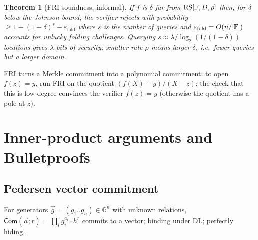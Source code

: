 \documentclass[11pt,a4paper]{report}
\theoremstyle{plain}
\newtheorem{theorem}{Theorem}[chapter]
\theoremstyle{definition}
\theoremstyle{remark}
\newcommand{\GG}{\mathbb{G}}
\begin{document}
\begin{theorem}[FRI soundness, informal]
If $f$ is $\delta$-far from $\mathrm{RS}[\mathbb{F},D,\rho]$ then, for $\delta$ below the Johnson bound, the verifier rejects with probability $\ge1-(1-\delta)^s-\varepsilon_{\mathrm{fold}}$ where $s$ is the number of queries and $\varepsilon_{\mathrm{fold}}=O(n/|\mathbb{F}|)$ accounts for unlucky folding challenges. Querying $s\approx\lambda/\log_2(1/(1-\delta))$ locations gives $\lambda$ bits of security; smaller rate $\rho$ means larger $\delta$, i.e.\ fewer queries but a larger domain.
\end{theorem}
FRI turns a Merkle commitment into a polynomial commitment: to open $f(z)=y$, run FRI on the quotient $(f(X)-y)/(X-z)$; the check that this is low-degree convinces the verifier $f(z)=y$ (otherwise the quotient has a pole at $z$).

\section{Inner-product arguments and Bulletproofs}
\subsection{Pedersen vector commitment}
For generators $\vec g=(g_1..g_n)\in\GG^n$ with unknown relations, $\mathsf{Com}(\vec a;r)=\prod_ig_i^{a_i}\cdot h^r$ commits to a vector; binding under DL; perfectly hiding.
\end{document}
